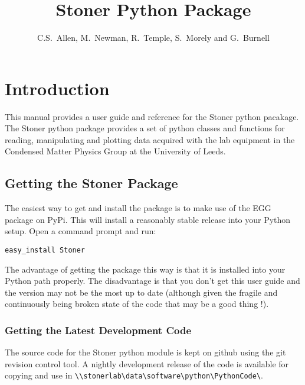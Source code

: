 \documentclass[a4paper,11pt]{scrartcl}
\author{C.S.~Allen, M.~Newman, R.~Temple, S.~Morely  and G.~Burnell}
\title{Stoner Python Package}
\begin{document}
\maketitle

\tableofcontents
\newpage
\pagestyle{scrheadings} 
\ifoot[\today]{\today}



  \section{Introduction}

This manual provides a user guide and reference for the Stoner python pacakage.
The Stoner python package provides a set of python classes and functions for
reading, manipulating and plotting data acquired with the lab equipment in the
Condensed Matter Physics Group at the University of Leeds.

\subsection{Getting the Stoner Package}

The easiest way to get and install the package is to make use of the EGG
package on PyPi. This will install a reasonably stable release into your
Python setup. Open a command prompt and run:

\begin{verbatim}
easy_install Stoner
\end{verbatim}

The advantage of getting the package this way is that it is installed into your Python path properly.
The disadvantage is that you don't get this user guide and the version may not be the most
up to date (although given the fragile and continuously being broken state of the code that may be
a good thing !).

\subsubsection{Getting the Latest Development Code}


The source code for the Stoner python module is kept on github using the git 
revision control tool. A nightly development release of the code is available for copying and
use in \verb#\\stonerlab\data\software\python\PythonCode\#. 
\end{document}

